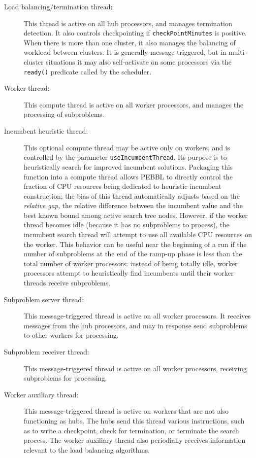\begin{description}
\item[Load balancing/termination thread:] This thread is active on
  all hub processors, and manages termination detection.  It also
  controls checkpointing if \texttt{checkPointMinutes} is positive.  When
  there is more than one cluster, it also manages the balancing of
  workload between clusters.  It is generally message-triggered, but
  in multi-cluster situations it may also self-activate on some
  processors via the \texttt{ready()} predicate called by the scheduler.

\item[Worker thread:] This compute thread is active on all worker
  processors, and manages the processing of subproblems.

\item[Incumbent heuristic thread:] This optional compute thread may be
  active only on workers, and is controlled by the parameter
  \texttt{useIncumbentThread}.  Its purpose is to heuristically search
  for improved incumbent solutions.  Packaging this function into a
  compute thread allows PEBBL to directly control the fraction of CPU
  resources being dedicated to heuristic incumbent construction; the
  bias of this thread automatically adjusts based on the \emph{relative
  gap}, the relative difference between the incumbent value
  and the best known bound among active search tree nodes.  However,
  if the worker thread becomes idle (because it has no subproblems to
  process), the incumbent search thread will attempt to use all
  available CPU resources on the worker.  This behavior can be useful
  near the beginning of a run if the number of subproblems at the end of
  the ramp-up phase is less than the total number of worker
  processors: instead of being totally idle, worker
  processors attempt to heuristically find incumbents until their
  worker threads receive subproblems.

\item[Subproblem server thread:] This message-triggered thread is
  active on all worker processors.  It receives messages from the hub
  processors, and may in response send subproblems to other workers
  for processing.

\item[Subproblem receiver thread:]  This message-triggered thread is
  active on all worker processors, receiving subproblems for processing.

\item[Worker auxiliary thread:] This message-triggered thread is
  active on workers that are not also functioning as hubs.  The hubs
  send this thread various instructions, such as to write a
  checkpoint, check for termination, or terminate the search process.
  The worker auxiliary thread also periodially receives information
  relevant to the load balancing algorithms.

\end{description}

